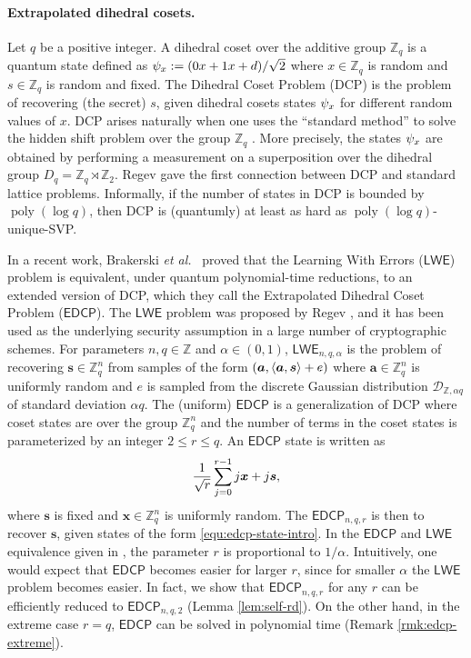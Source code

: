 \documentclass[11pt]{article}
\theoremstyle{plain}
\theoremstyle{definition}
\DeclareMathOperator{\poly}{poly}
\let\ket\relax
\DeclarePairedDelimiter{\ket}{\lvert}{\rangle}
\DeclarePairedDelimiter{\lrang}{\langle}{\rangle}
\def\Z{\mathbb{Z}}
\def\lwe{\mathsf{LWE}}
\def\edcp{\mathsf{EDCP}}
\begin{document}
\paragraph{Extrapolated dihedral cosets.}
Let $q$ be a positive integer. A dihedral coset over the additive group $\Z_q$ is a quantum state defined as $\ket{\psi_x} := (\ket{0}\ket{x} + \ket{1}\ket{x + d}) / \sqrt{2}$ where $x \in \Z_q$ is random and $s \in \Z_q$ is random and fixed. The Dihedral Coset Problem (DCP) is the problem of recovering (the secret) $s$, given dihedral cosets states $\ket{\psi_x}$ for different random values of $x$. DCP arises naturally when one uses the ``standard method'' to solve the hidden shift problem over the group $\Z_q$ \cite{childs2010quantum}. More precisely, the states $\ket{\psi_x}$ are obtained by performing a measurement on a superposition over the dihedral group $D_q = \Z_q \rtimes \Z_2$. Regev \cite{regev2004quantum} gave the first connection between DCP and standard lattice problems. Informally, if the number of states in DCP is bounded by $\poly(\log q)$, then DCP is (quantumly) at least as hard as $\poly(\log q)$-unique-SVP. 

In a recent work, Brakerski \textit{et al.}~\cite{brakerski2018learning} proved that the Learning With Errors ($\lwe$) problem is equivalent, under quantum polynomial-time reductions, to an extended version of DCP, which they call the Extrapolated Dihedral Coset Problem ($\edcp$). The $\lwe$ problem was proposed by Regev \cite{regev2005lattices, regev2009lattices}, and it has been used as the underlying security assumption in a large number of cryptographic schemes. For parameters $n, q \in \Z$ and $\alpha \in (0, 1)$, $\lwe_{n, q, \alpha}$ is the problem of recovering $\bm{s} \in \Z_q^n$ from samples of the form $(\bm{a}, \lrang{\bm{a}, \bm{s}} + e)$ where $\bm{a} \in \Z_q^n$ is uniformly random and $e$ is sampled from the discrete Gaussian distribution $\mathcal{D}_{\Z, \alpha q}$ of standard deviation $\alpha q$. The (uniform) $\edcp$ is a generalization of DCP where coset states are over the group $\Z_q^n$ and the number of terms in the coset states is parameterized by an integer $2 \le r \le q$. An $\edcp$ state is written as
\begin{equation}
    \label{equ:edcp-state-intro}
    \frac{1}{\sqrt{r}} \sum_{j = 0}^{r - 1}\ket{j}\ket{\bm{x} + j\bm{s}},
\end{equation}
where $\bm{s}$ is fixed and $\bm{x} \in \Z_q^n$ is uniformly random. The $\edcp_{n, q, r}$ is then to recover $\bm{s}$, given states of the form \eqref{equ:edcp-state-intro}. In the $\edcp$ and $\lwe$ equivalence given in \cite{brakerski2018learning}, the parameter $r$ is proportional to $1 / \alpha$. Intuitively, one would expect that $\edcp$ becomes easier for larger $r$, since for smaller $\alpha$ the $\lwe$ problem becomes easier. In fact, we show that $\edcp_{n, q, r}$ for any $r$ can be efficiently reduced to $\edcp_{n, q, 2}$ (Lemma \ref{lem:self-rd}). On the other hand, in the extreme case $r = q$, $\edcp$ can be solved in polynomial time (Remark \ref{rmk:edcp-extreme}). 
\end{document}
